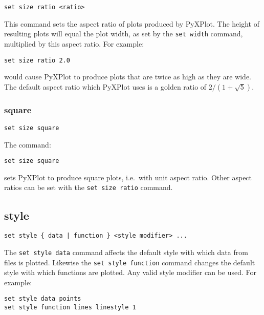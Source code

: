 \begin{verbatim}
set size ratio <ratio>
\end{verbatim}

This command sets the aspect ratio of plots produced by PyXPlot.  The height of
resulting plots will equal the plot width, as set by the {\tt set width}
command, multiplied by this aspect ratio.  For example:

\begin{verbatim}
set size ratio 2.0
\end{verbatim}

\noindent would cause PyXPlot to produce plots that are twice as high as they
are wide.  The default aspect ratio which PyXPlot uses is a golden ratio of
$2/(1+\sqrt{5})$.


\subsubsection{square}

\begin{verbatim}
set size square
\end{verbatim}

The command:

\begin{verbatim}
set size square
\end{verbatim}

\noindent sets PyXPlot to produce square plots, i.e.\ with unit aspect ratio. Other aspect
ratios can be set with the {\tt set size ratio} command.

\subsection{style}

\begin{verbatim}
set style { data | function } <style modifier> ...
\end{verbatim}

The {\tt set style data} command affects the default style with which data from
files is plotted.  Likewise the {\tt set style function} command changes the
default style with which functions are plotted.  Any valid style modifier can
be used.  For example:

\begin{verbatim}
set style data points
set style function lines linestyle 1
\end{verbatim}

